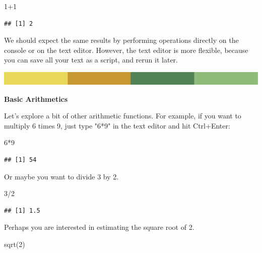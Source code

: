 \documentclass[
]{book}
\newenvironment{Shaded}{\begin{snugshade}}{\end{snugshade}}
\newcommand{\DecValTok}[1]{\textcolor[rgb]{0.00,0.00,0.81}{#1}}
\newcommand{\FunctionTok}[1]{\textcolor[rgb]{0.00,0.00,0.00}{#1}}
\newcommand{\NormalTok}[1]{#1}
\newcommand{\SpecialCharTok}[1]{\textcolor[rgb]{0.00,0.00,0.00}{#1}}
\begin{document}
\begin{Shaded}
\begin{Highlighting}[]
\DecValTok{1}\SpecialCharTok{+}\DecValTok{1}
\end{Highlighting}
\end{Shaded}

\begin{verbatim}
## [1] 2
\end{verbatim}

We should expect the same results by performing operations directly on the console or on the text editor. However, the text editor is more flexible, because you can save all your text as a script, and rerun it later.

\includegraphics{rsrstrip.png}

\textbf{Basic Arithmetics }

Let's explore a bit of other arithmetic functions. For example, if you want to multiply 6 times 9, just type "6*9" in the text editor and hit Ctrl+Enter:

\begin{Shaded}
\begin{Highlighting}[]
\DecValTok{6}\SpecialCharTok{*}\DecValTok{9}
\end{Highlighting}
\end{Shaded}

\begin{verbatim}
## [1] 54
\end{verbatim}

Or maybe you want to divide 3 by 2.

\begin{Shaded}
\begin{Highlighting}[]
\DecValTok{3}\SpecialCharTok{/}\DecValTok{2}
\end{Highlighting}
\end{Shaded}

\begin{verbatim}
## [1] 1.5
\end{verbatim}

Perhaps you are interested in estimating the square root of 2.

\begin{Shaded}
\begin{Highlighting}[]
\FunctionTok{sqrt}\NormalTok{(}\DecValTok{2}\NormalTok{)}
\end{Highlighting}
\end{Shaded}
\end{document}
